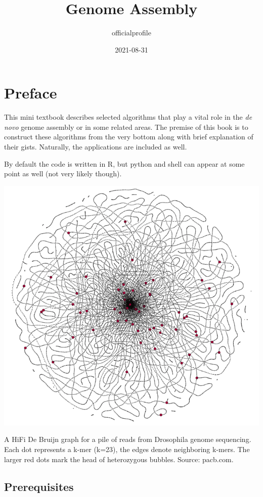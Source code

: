 \documentclass[
]{book}
\title{Genome Assembly}
\author{officialprofile}
\date{2021-08-31}
\begin{document}
\maketitle

{
\setcounter{tocdepth}{1}
\tableofcontents
}
\hypertarget{preface}{%
\chapter{Preface}\label{preface}}

This mini textbook describes selected algorithms that play a vital role in the \emph{de novo} genome assembly or in some related areas. The premise of this book is to construct these algorithms from the very bottom along with brief explanation of their gists. Naturally, the applications are included as well.

By default the code is written in R, but python and shell can appear at some point as well (not very likely though).

\begin{center}\includegraphics[width=0.8\linewidth]{img/cover} \end{center}

A HiFi De Bruijn graph for a pile of reads from Drosophila genome sequencing. Each dot represents a k-mer (k=23), the edges denote neighboring k-mers. The larger red dots mark the head of heterozygous bubbles. Source: pacb.com.

\hypertarget{prerequisites}{%
\section{Prerequisites}\label{prerequisites}}
\end{document}
